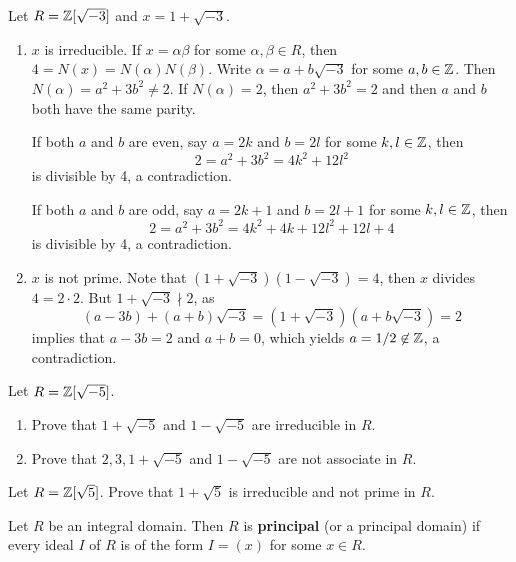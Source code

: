 \chapter{}

\begin{example}
	Let $R=\mathbb{Z}[\sqrt{-3}]$ and $x=1+\sqrt{-3}$. 
	\begin{enumerate}
		\item $x$ is irreducible. 
	If $x=\alpha\beta$ for some $\alpha,\beta\in R$, then 
	$4=N(x)=N(\alpha)N(\beta)$. Write $\alpha=a+b\sqrt{-3}$ for some $a,b\in\mathbb{Z}$. Then
	$N(\alpha)=a^2+3b^2\ne 2$. If $N(\alpha)=2$, then $a^2+3b^2=2$ and then $a$ and $b$
	both have the same parity. 
	
	If both $a$ and $b$ are even, say $a=2k$ and $b=2l$ for
	some $k,l\in\mathbb{Z}$, then 
	\[
	2=a^2+3b^2=4k^2+12l^2
	\]
	is divisible by 4, a contradiction.  
	
	If both $a$ and $b$ are odd, say $a=2k+1$ and $b=2l+1$ for some $k,l\in\mathbb{Z}$, then
	\[
	2=a^2+3b^2=4k^2+4k+12l^2+12l+4
	\]
	is divisible by 4, a contradiction. 
		\item $x$ is not prime. Note that $(1+\sqrt{-3})(1-\sqrt{-3})=4$, then 
		$x$ divides $4=2\cdot 2$. But $1+\sqrt{-3}\nmid 2$, as 
		\[
		(a-3b)+(a+b)\sqrt{-3}=(1+\sqrt{-3})(a+b\sqrt{-3})=2
		\]
		implies that $a-3b=2$ and $a+b=0$, which yields 
		$a=1/2\not\in\mathbb{Z}$, a contradiction.
	\end{enumerate}
\end{example}

\begin{exercise}
	Let $R=\mathbb{Z}[\sqrt{-5}]$. 
	\begin{enumerate}
		\item Prove that $1+\sqrt{-5}$ and $1-\sqrt{-5}$ are irreducible in $R$. 
		\item Prove that $2,3,1+\sqrt{-5}$ and $1-\sqrt{-5}$ are not associate in $R$.
	\end{enumerate}
\end{exercise}

\begin{exercise}
	Let $R=\mathbb{Z}[\sqrt{5}]$. Prove that $1+\sqrt{5}$ is irreducible and not prime in $R$. 	
\end{exercise}

\begin{definition}
	Let $R$ be an integral domain. Then $R$ is \textbf{principal} (or a principal domain) if
	every ideal $I$ of $R$ is of the form $I=(x)$ for some $x\in R$.   
\end{definition}

